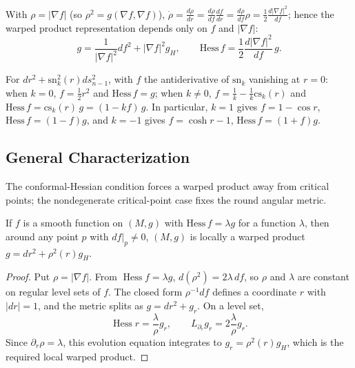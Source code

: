 \begin{remark}
  \label{rem:pet-ch4-warped-product-canonical-form}

  With $\rho=|\nabla f|$ (so $\rho^2=g(\nabla f,\nabla f)$),
  $\dot\rho=\tfrac{d\rho}{dr}=\tfrac{d\rho}{df}\tfrac{df}{dr}=\tfrac{d\rho}{df}\rho
  =\tfrac12\tfrac{d|\nabla f|^2}{df}$; hence the warped product representation
  depends only on $f$ and $|\nabla f|$:
  \[
    g=\frac1{|\nabla f|^2}df^2+|\nabla f|^2g_H,\qquad
    \mathrm{Hess}\,f=\frac12\frac{d|\nabla f|^2}{df}\,g.
  \]
\end{remark}

\begin{example}
  \label{ex:pet-ch4-hess-f-space-forms}

  For $dr^2+\mathrm{sn}_k^2(r)ds_{n-1}^2$, with $f$ the antiderivative of
  $\mathrm{sn}_k$ vanishing at $r=0$: when $k=0$, $f=\tfrac12r^2$ and
  $\mathrm{Hess}\,f=g$; when $k\ne0$, $f=\tfrac1k-\tfrac1k\mathrm{cs}_k(r)$ and
  $\mathrm{Hess}\,f=\mathrm{cs}_k(r)\,g=(1-kf)\,g$. In particular, $k=1$ gives
  $f=1-\cos r$, $\mathrm{Hess}\,f=(1-f)g$, and $k=-1$ gives $f=\cosh r-1$,
  $\mathrm{Hess}\,f=(1+f)g$.
\end{example}

\subsection{General Characterization}

The conformal-Hessian condition forces a warped product away from critical points;
the nondegenerate critical-point case fixes the round angular metric.

\begin{theorem}
  \label{thm:pet-ch4-brinkmann-warped-product}

  If $f$ is a smooth function on $(M,g)$ with $\mathrm{Hess}\,f=\lambda g$ for a
  function $\lambda$, then around any point $p$ with $df|_p\ne0$, $(M,g)$ is
  locally a warped product $g=dr^2+\rho^2(r)g_H$.
\end{theorem}
\begin{proof}
  \sketch
  Put $\rho=|\nabla f|$. From $\operatorname{Hess}f=\lambda g$,
  $d(\rho^2)=2\lambda\,df$, so $\rho$ and $\lambda$ are constant on regular
  level sets of $f$. The closed form $\rho^{-1}df$ defines a coordinate $r$
  with $|dr|=1$, and the metric splits as $g=dr^2+g_r$. On a level set,
  \[
    \operatorname{Hess}r=\frac{\lambda}{\rho}g_r,
    \qquad L_{\partial_r}g_r=2\frac{\lambda}{\rho}g_r.
  \]
  Since $\partial_r\rho=\lambda$, this evolution equation integrates to
  $g_r=\rho^2(r)g_H$, which is the required local warped product.
\end{proof}


